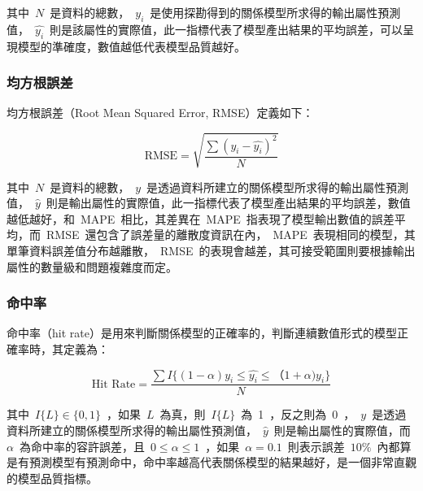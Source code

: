 其中~$N$~是資料的總數，~$y_i$~是使用探勘得到的關係模型所求得的輸出屬性預測值，~$\hat{y_i}$~則是該屬性的實際值，此一指標代表了模型產出結果的平均誤差，可以呈現模型的準確度，數值越低代表模型品質越好。


\subsubsection{均方根誤差}

均方根誤差（Root Mean Squared Error, RMSE）定義如下：

\begin{equation} \text{RMSE} = \sqrt{\dfrac{\sum{(y_i - \hat{y_i})^2}}{N}} \label{eq:RMSE}\end{equation}

其中~$N$~是資料的總數，~$y$~是透過資料所建立的關係模型所求得的輸出屬性預測值，~$\hat{y}$~則是輸出屬性的實際值，此一指標代表了模型產出結果的平均誤差，數值越低越好，和~MAPE~相比，其差異在~MAPE~指表現了模型輸出數值的誤差平均，而~RMSE~還包含了誤差量的離散度資訊在內，~MAPE~表現相同的模型，其單筆資料誤差值分布越離散，~RMSE~的表現會越差，其可接受範圍則要根據輸出屬性的數量級和問題複雜度而定。


\subsubsection{命中率}

命中率（hit rate）是用來判斷關係模型的正確率的，判斷連續數值形式的模型正確率時，其定義為：

\begin{equation} \text{Hit Rate} = \dfrac{ \sum{I\{(1 - \alpha)y_i \le \hat{y_i} \le（1 + \alpha)y_i \}} }{N} \label{eq:hitrate}\end{equation} 

其中~$I\{L\} \in \{0, 1\}$~，如果~$L$~為真，則~$I\{L\}$~為~1~，反之則為~0~，~$y$~是透過資料所建立的關係模型所求得的輸出屬性預測值，~$\hat{y}$~則是輸出屬性的實際值，而~$\alpha$~為命中率的容許誤差，且~$0 \le \alpha \le 1$~，如果~$\alpha = 0.1$~則表示誤差~$10\%$~內都算是有預測模型有預測命中，命中率越高代表關係模型的結果越好，是一個非常直觀的模型品質指標。

